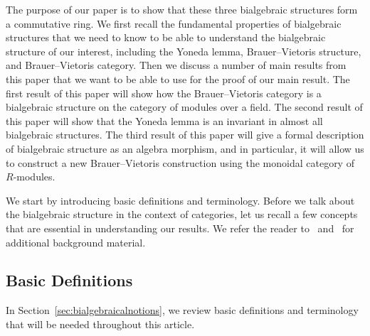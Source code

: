 \documentclass[a4paper,reqno,oneside]{article}
\begin{document}
The purpose of our paper is to show that these three bialgebraic structures form a commutative ring. We first recall the fundamental properties of bialgebraic structures that we need to know to be able to understand the bialgebraic structure of our interest, including the Yoneda lemma, Brauer--Vietoris structure, and Brauer--Vietoris category. Then we discuss a number of main results from this paper that we want to be able to use for the proof of our main result. The first result of this paper will show how the Brauer--Vietoris category is a bialgebraic structure on the category of modules over a field. The second result of this paper will show that the Yoneda lemma is an invariant in almost all bialgebraic structures. The third result of this paper will give a formal description of bialgebraic structure as an algebra morphism, and in particular, it will allow us to construct a new Brauer--Vietoris construction using the monoidal category of $R$-modules. 


We start by introducing basic definitions and terminology. Before we talk about the bialgebraic structure in the context of categories, let us recall a few concepts that are essential in understanding our results. We refer the reader to~\cite{caramello2023monoidal} and~\cite{kapranov2020twisted} for additional background material.   
 
\medskip  
\subsection*{Basic Definitions}
In Section~\ref{sec:bialgebraicalnotions}, we review basic definitions and terminology that will be needed throughout this article.  
\medskip  

\usepackage{amsmath}  
\usepackage{amssymb}  
\usepackage{tikz-cd}  
\end{document}
